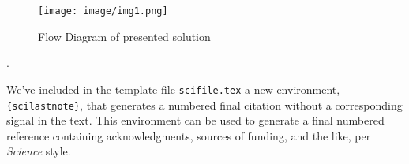 \documentclass[12pt]{article}
\newcounter{lastnote}
\newenvironment{scilastnote}{%
\setcounter{lastnote}{\value{enumiv}}%
\addtocounter{lastnote}{+1}%
\begin{list}%
{\arabic{lastnote}.}
{\setlength{\leftmargin}{.22in}}
{\setlength{\labelsep}{.5em}}}
{\end{list}}
\begin{document}
\begin{figure}[h]
    \centering
    \texttt{[image: image/img1.png]}
    \caption{Flow Diagram of presented solution}
    \label{fig:my_label}
\end{figure}















\begin{scilastnote}
\item We've included in the template file \texttt{scifile.tex} a new
environment, \texttt{\{scilastnote\}}, that generates a numbered final
citation without a corresponding signal in the text.  This environment
can be used to generate a final numbered reference containing
acknowledgments, sources of funding, and the like, per {\it Science\/}
style.
\end{scilastnote}






\clearpage
\end{document}
